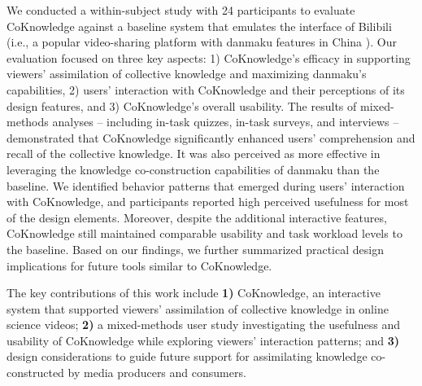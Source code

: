 

We conducted a within-subject study with 24 participants to evaluate CoKnowledge against a baseline system that emulates the interface of Bilibili (i.e., a popular video-sharing platform with danmaku features in China \cite{bilibili_about_us}). Our evaluation focused on three key aspects: 1) CoKnowledge's efficacy in supporting viewers' assimilation of collective knowledge and maximizing danmaku's capabilities, 2) users' interaction with CoKnowledge and their perceptions of its design features, and 3) CoKnowledge's overall usability. The results of mixed-methods analyses -- including in-task quizzes, in-task surveys, and interviews -- demonstrated that CoKnowledge significantly enhanced users' comprehension and recall of the collective knowledge. It was also perceived as more effective in leveraging the knowledge co-construction capabilities of danmaku 
than the baseline. %
We identified behavior patterns that emerged during users' interaction with CoKnowledge, and participants reported high perceived usefulness for most of the design elements. Moreover, despite the additional interactive features, CoKnowledge still maintained comparable usability and task workload levels to the baseline. Based on our findings, we further summarized practical design implications for future tools similar to CoKnowledge.

The key contributions of this work include
\textbf{1)} CoKnowledge, an interactive system that supported viewers' assimilation of collective knowledge in online science videos; \textbf{2)} a mixed-methods user study investigating the usefulness and usability of CoKnowledge while exploring viewers' interaction patterns; and \textbf{3)} design considerations to guide future support for assimilating knowledge co-constructed by media producers and consumers.
